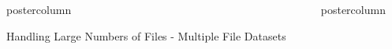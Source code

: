 \documentclass[final,poster]{beamer}
\newlength{\columnheight}
\begin{document}
\begin{frame}
\begin{columns}
\begin{column}{.67\textwidth}
\begin{beamercolorbox}[center,wd=\textwidth]{postercolumn}
\begin{minipage}[T]{.98\textwidth}
{\begin{block}{Handling Large Numbers of Files - Multiple File Datasets}
                \begin{columns}
                  \begin{column}{.30\textwidth}
                    \workflowlimitfigs
                  \end{column}
                  \begin{column}{.43\textwidth}
                    \multiplefiledatasetsdesc
                  \end{column}
                  \begin{column}{.25\textwidth}
                    \openmsfig
                  \end{column}
                \end{columns}
              \end{block}
            }
          \end{minipage}
        \end{beamercolorbox}
      \end{column}              

      \begin{column}{.33\textwidth}
        \begin{beamercolorbox}[center,wd=\textwidth]{postercolumn}
          \begin{minipage}[T]{.98\textwidth} %
            \parbox[t][\columnheight]{\textwidth}{
              \windowschallangesblock
              \vfill
              \lwrblock
              \vfill
              \msconvertblock
              \vfill
              \maxquantblock
              \vfill
              \proteinpilotblock
            }
          \end{minipage}
        \end{beamercolorbox}
      \end{column}              
    \end{columns}   
  \end{frame}
\end{document}
